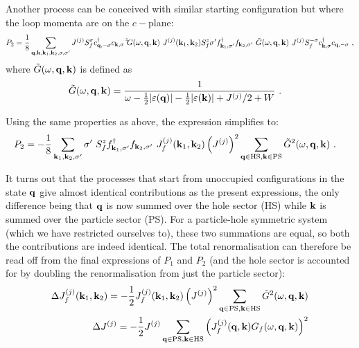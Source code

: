 \documentclass[%
reprint,
superscriptaddress,
groupedaddress,
superscriptaddress,
onecolumn,
]{revtex4-2}
\begin{document}
Another process can be conceived with similar starting configuration but where the loop momenta are on the \(c-\)plane:
\begin{equation}\begin{aligned}
	P_2 = \frac{1}{8}\sum_{{\bf q},{\bf k},{\bf k}_1, {\bf k}_2,\sigma,\sigma^\prime} J^{(j)} S_f^\sigma c^\dagger_{{\bf q},-\sigma}c_{{\bf k},\sigma} ~ \tilde \tilde G(\omega, {\bf q}, {\bf k}) ~ J^{(j)}({\bf k}_1,{\bf k}_2) S_f^z \sigma^\prime f^\dagger_{{\bf k}_1,\sigma^\prime}f_{{\bf k}_2,\sigma^\prime} ~ \tilde G(\omega, {\bf q}, {\bf k}) ~ J^{(j)} S_f^{-\sigma} c^\dagger_{{\bf k},\sigma}c_{{\bf q},-\sigma}~,
\end{aligned}\end{equation}
where \(\tilde G(\omega,{\bf q}, {\bf k})\) is defined as
\begin{equation}\begin{aligned}
	\tilde G(\omega,{\bf q}, {\bf k}) &= \frac{1}{\omega - \frac{1}{2}|\varepsilon({\bf q})| - \frac{1}{2}|\varepsilon({\bf k})| + J^{(j)}/2 + W}~.
\end{aligned}\end{equation}


Using the same properties as above, the expression simplifies to:
\begin{equation}\begin{aligned}
	P_2 &= -\frac{1}{8}\sum_{{\bf k}_1, {\bf k}_2,\sigma^\prime} \sigma^\prime~S_f^z f^\dagger_{{\bf k}_1,\sigma^\prime}f_{{\bf k}_2,\sigma^\prime} ~  J_f^{(j)}({\bf k}_1,{\bf k}_2) \left(J^{(j)}\right)^2 \sum_{{\bf q} \in \text{HS} ,{\bf k} \in \text{PS}}\tilde G^2(\omega,{\bf q}, {\bf k})~.
\end{aligned}\end{equation}

It turns out that the processes that start from unoccupied configurations in the state \({\bf q}\) give almost identical contributions as the present expressions, the only difference being that \({\bf q}\) is now summed over the hole sector (HS) while \({\bf k}\) is summed over the particle sector (PS). For a particle-hole symmetric system (which we have restricted ourselves to), these two summations are equal, so both the contributions are indeed identical. The total renormalisation can therefore be read off from the final expressions of \(P_1\) and \(P_2\) (and the hole sector is accounted for by doubling the renormalisation from just the particle sector):
\begin{equation}\begin{aligned}
	\Delta J_f^{(j)}({\bf k}_1,{\bf k}_2) = -\frac{1}{2}J_f^{(j)}({\bf k}_1,{\bf k}_2) \left(J^{(j)}\right)^2 \sum_{{\bf q} \in \text{PS} ,{\bf k} \in \text{HS}}\tilde G^2(\omega, {\bf q}, {\bf k})\\
	\Delta J^{(j)} = -\frac{1}{2}J^{(j)} \sum_{{\bf q} \in \text{PS} ,{\bf k} \in \text{HS}}\left(J_f^{(j)}({\bf q},{\bf k}) G_f(\omega, {\bf q}, {\bf k})\right)^2\\
\end{aligned}\end{equation}
\end{document}
